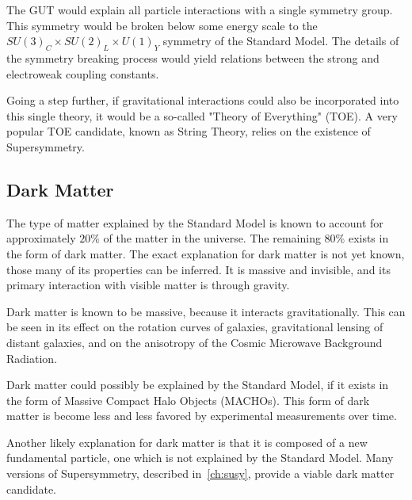 The GUT would explain all particle interactions with a single symmetry group.
This symmetry would be broken below some energy scale to the $SU(3)_C \times SU(2)_L \times U(1)_Y$ symmetry of the Standard Model.
The details of the symmetry breaking process would yield relations between the strong and electroweak coupling constants.

Going a step further, if gravitational interactions could also be incorporated into this single theory,
it would be a so-called "Theory of Everything" (TOE).
A very popular TOE candidate, known as String Theory, relies on the existence of Supersymmetry.

\subsection{Dark Matter}\label{subsec:sm_dark_matter}

The type of matter explained by the Standard Model is known to account for approximately $20\%$ of the matter in the universe.
The remaining $80\%$ exists in the form of dark matter.
The exact explanation for dark matter is not yet known, those many of its properties can be inferred.
It is massive and invisible, and its primary interaction with visible matter is through gravity.

Dark matter is known to be massive, because it interacts gravitationally.
This can be seen in its effect on the rotation curves of galaxies, gravitational lensing of distant galaxies,
and on the anisotropy of the Cosmic Microwave Background Radiation.

Dark matter could possibly be explained by the Standard Model, if it exists in the form of Massive Compact Halo Objects (MACHOs).
This form of dark matter is become less and less favored by experimental measurements over time.

Another likely explanation for dark matter is that it is composed of a new fundamental particle,
one which is not explained by the Standard Model.
Many versions of Supersymmetry, described in~\ref{ch:susy}, provide a viable dark matter candidate.

